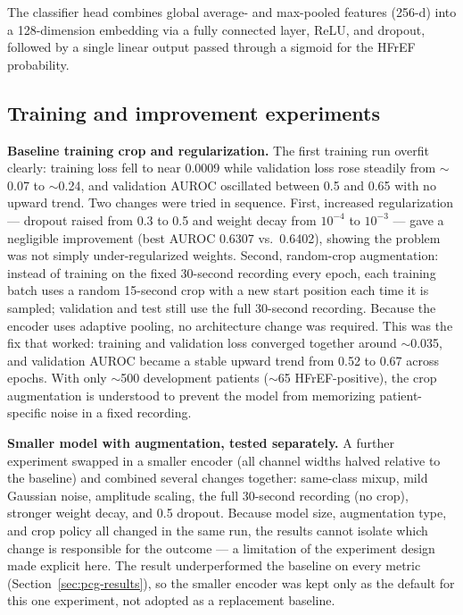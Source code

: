 \documentclass[11pt,a4paper]{article}
\begin{document}
The classifier head combines global average- and max-pooled features (256-d)
into a 128-dimension embedding via a fully connected layer, ReLU, and
dropout, followed by a single linear output passed through a sigmoid for the
HFrEF probability.

\subsection{Training and improvement experiments}
\textbf{Baseline training crop and regularization.} The first training run
overfit clearly: training loss fell to near 0.0009 while validation loss rose
steadily from $\sim$0.07 to $\sim$0.24, and validation AUROC oscillated
between 0.5 and 0.65 with no upward trend. Two changes were tried in
sequence. First, increased regularization --- dropout raised from 0.3 to 0.5
and weight decay from $10^{-4}$ to $10^{-3}$ --- gave a negligible
improvement (best AUROC 0.6307 vs.\ 0.6402), showing the problem was not
simply under-regularized weights. Second, random-crop augmentation: instead
of training on the fixed 30-second recording every epoch, each training
batch uses a random 15-second crop with a new start position each time it is
sampled; validation and test still use the full 30-second recording. Because
the encoder uses adaptive pooling, no architecture change was required. This
was the fix that worked: training and validation loss converged together
around $\sim$0.035, and validation AUROC became a stable upward trend from
0.52 to 0.67 across epochs. With only $\sim$500 development patients
($\sim$65 HFrEF-positive), the crop augmentation is understood to prevent the
model from memorizing patient-specific noise in a fixed recording.

\textbf{Smaller model with augmentation, tested separately.} A further
experiment swapped in a smaller encoder (all channel widths halved relative
to the baseline) and combined several changes together: same-class mixup,
mild Gaussian noise, amplitude scaling, the full 30-second recording (no
crop), stronger weight decay, and 0.5 dropout. Because model size,
augmentation type, and crop policy all changed in the same run, the results
cannot isolate which change is responsible for the outcome --- a limitation
of the experiment design made explicit here. The result underperformed the
baseline on every metric (Section~\ref{sec:pcg-results}), so the smaller
encoder was kept only as the default for this one experiment, not adopted as
a replacement baseline.
\end{document}
